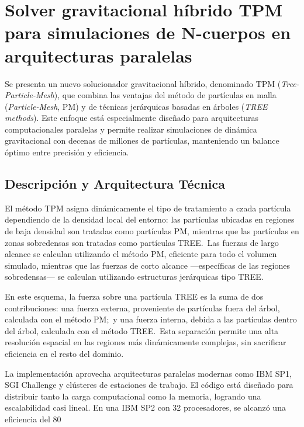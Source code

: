 \section[Solver gravitacional híbrido TPM]{Solver gravitacional híbrido TPM para simulaciones de N-cuerpos en arquitecturas paralelas}%
\label{sec:state_of_the_art_07}
Se presenta un nuevo solucionador gravitacional híbrido, denominado TPM (\textit{Tree-Particle-Mesh}), que combina las ventajas del método de partículas en malla (\textit{Particle-Mesh}, PM) y de técnicas jerárquicas basadas en árboles (\textit{TREE methods}). Este enfoque está especialmente diseñado para arquitecturas computacionales paralelas y permite realizar simulaciones de dinámica gravitacional con decenas de millones de partículas, manteniendo un balance óptimo entre precisión y eficiencia.

\subsection{Descripción y Arquitectura Técnica}

El método TPM asigna dinámicamente el tipo de tratamiento a czada partícula dependiendo de la densidad local del entorno: las partículas ubicadas en regiones de baja densidad son tratadas como partículas PM, mientras que las partículas en zonas sobredensas son tratadas como partículas TREE.\ Las fuerzas de largo alcance se calculan utilizando el método PM, eficiente para todo el volumen simulado, mientras que las fuerzas de corto alcance —específicas de las regiones sobredensas— se calculan utilizando estructuras jerárquicas tipo TREE.\

En este esquema, la fuerza sobre una partícula TREE es la suma de dos contribuciones: una fuerza externa, proveniente de partículas fuera del árbol, calculada con el método PM;\ y una fuerza interna, debida a las partículas dentro del árbol, calculada con el método TREE.\ Esta separación permite una alta resolución espacial en las regiones más dinámicamente complejas, sin sacrificar eficiencia en el resto del dominio.

La implementación aprovecha arquitecturas paralelas modernas como IBM SP1, SGI Challenge y clústeres de estaciones de trabajo. El código está diseñado para distribuir tanto la carga computacional como la memoria, logrando una escalabilidad casi lineal. En una IBM SP2 con 32 procesadores, se alcanzó una eficiencia del 80%


